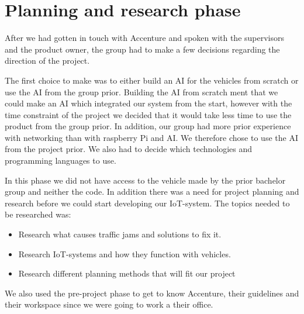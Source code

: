 \section{Planning and research phase}

After we had gotten in touch with Accenture and spoken with the supervisors and the product owner, the group had to make a few decisions regarding the direction of the project.

The first choice to make was to either build an AI for the vehicles from scratch or use the AI from the group prior. Building the AI from scratch ment that we could make an AI which integrated our system from the start, however with the time constraint of the project we decided that it would take less time to use the product from the group prior. In addition, our group had more prior experience with networking than with raspberry Pi and AI. We therefore chose to use the AI from the project prior. We also had to decide which technologies and programming languages to use.

In this phase we did not have access to the vehicle made by the prior bachelor group and neither the code. In addition there was a need for project planning and research before we could start developing our IoT-system. The topics needed to be researched was:

\begin{itemize}
\item Research what causes traffic jams and solutions to fix it.
\item Research IoT-systems and how they function with vehicles.
\item Research different planning methods that will fit our project
\end{itemize}
We also used the pre-project phase to get to know Accenture, their guidelines and their workspace since we were going to work a their office. 








\clearpage
